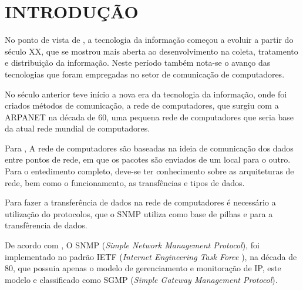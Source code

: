\chapter*{INTRODUÇÃO}


\par No ponto de vista de , a tecnologia da
informação começou a evoluir a partir do século XX, que se mostrou mais 
aberta ao desenvolvimento na coleta, tratamento e distribuição da 
informação. Neste período também nota-se o avanço das tecnologias 
que foram empregadas no setor de comunicação de computadores.

\par No século anterior teve início a nova era da tecnologia da informação, onde
foi criados métodos de comunicação, a rede de computadores, que surgiu com a
ARPANET na década de 60, uma pequena rede de computadores que seria base da
atual rede mundial de computadores.

\par Para , A rede de computadores são baseadas
na ideia de comunicação dos dados entre pontos de rede, em que os pacotes são
enviados de um local para o outro. Para o entedimento completo, deve-se ter
conhecimento sobre as arquiteturas de rede, bem como o funcionamento, as
transfências e tipos de dados.

\par Para fazer a transferência de dados na rede de computadores é necessário a
utilização do protocolos, que o SNMP utiliza como base de pilhas e para a
transfêrencia de dados.

\par De acordo com , O SNMP (\textit{Simple
Network Management Protocol}), foi implementado no padrão IETF 
(\textit{Internet Engineering Task Force }), na década de 80, que possuia apenas
o modelo de gerenciamento e monitoração de IP, este modelo e classificado como
SGMP (\textit{Simple Gateway Management Protocol}). 

